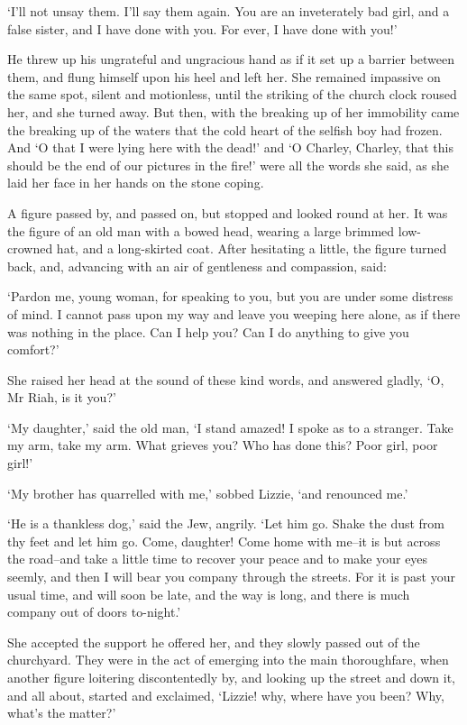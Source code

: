 ‘I’ll not unsay them. I’ll say them again. You are an inveterately bad
girl, and a false sister, and I have done with you. For ever, I have
done with you!’

He threw up his ungrateful and ungracious hand as if it set up a barrier
between them, and flung himself upon his heel and left her. She remained
impassive on the same spot, silent and motionless, until the striking
of the church clock roused her, and she turned away. But then, with the
breaking up of her immobility came the breaking up of the waters that
the cold heart of the selfish boy had frozen. And ‘O that I were lying
here with the dead!’ and ‘O Charley, Charley, that this should be the
end of our pictures in the fire!’ were all the words she said, as she
laid her face in her hands on the stone coping.

A figure passed by, and passed on, but stopped and looked round at
her. It was the figure of an old man with a bowed head, wearing a large
brimmed low-crowned hat, and a long-skirted coat. After hesitating a
little, the figure turned back, and, advancing with an air of gentleness
and compassion, said:

‘Pardon me, young woman, for speaking to you, but you are under some
distress of mind. I cannot pass upon my way and leave you weeping here
alone, as if there was nothing in the place. Can I help you? Can I do
anything to give you comfort?’

She raised her head at the sound of these kind words, and answered
gladly, ‘O, Mr Riah, is it you?’

‘My daughter,’ said the old man, ‘I stand amazed! I spoke as to a
stranger. Take my arm, take my arm. What grieves you? Who has done this?
Poor girl, poor girl!’

‘My brother has quarrelled with me,’ sobbed Lizzie, ‘and renounced me.’

‘He is a thankless dog,’ said the Jew, angrily. ‘Let him go. Shake the
dust from thy feet and let him go. Come, daughter! Come home with me--it
is but across the road--and take a little time to recover your peace and
to make your eyes seemly, and then I will bear you company through the
streets. For it is past your usual time, and will soon be late, and the
way is long, and there is much company out of doors to-night.’

She accepted the support he offered her, and they slowly passed out
of the churchyard. They were in the act of emerging into the main
thoroughfare, when another figure loitering discontentedly by, and
looking up the street and down it, and all about, started and exclaimed,
‘Lizzie! why, where have you been? Why, what’s the matter?’

